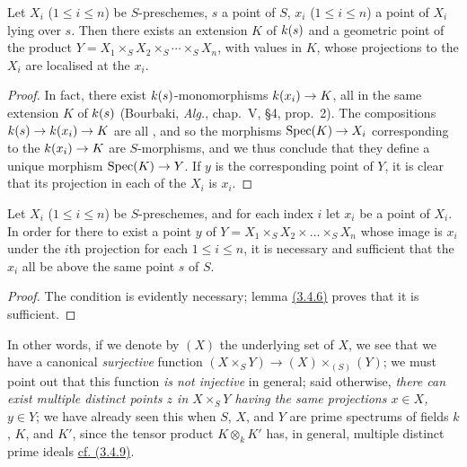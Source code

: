 \begin{lem}[3.4.6]
\label{lem-1.3.4.6}
Let $X_i$ ($1\leqslant i\leqslant n$) be $S$-preschemes, $s$ a point of $S$, $x_i$
($1\leqslant i\leqslant n$) a point of $X_i$ lying over $s$. Then there exists an extension
$K$ of $k(s)$ and a geometric point of the product
$Y=X_1\times_S X_2\times_S\cdots\times_S X_n$, with values in $K$, whose projections to
the $X_i$ are localised at the $x_i$.
\end{lem}

\begin{proof}
\label{proof-lem-1.3.4.6}
In fact, there exist $k(s)$-monomorphisms $k(x_i)\to K$, all in the same extension $K$ of $k(s)$ (Bourbaki, \emph{Alg.}, chap.~V, §4, prop.~2).
The compositions $k(s)\to k(x_i)\to K$ are all , and so the morphisms ${\mathop{\mathrm{Spec}}\nolimits}(K)\to X_i$ corresponding to the $k(x_i)\to K$ are $S$-morphisms, and we thus conclude that they define a unique morphism ${\mathop{\mathrm{Spec}}\nolimits}(K)\to Y$.
If $y$ is the corresponding point of $Y$, it is clear that its projection in each of the $X_i$ is $x_i$.
\end{proof}

\begin{prop}[3.4.7]
\label{prop-1.3.4.7}
Let $X_i$ ($1\leqslant i\leqslant n$) be $S$-preschemes, and for each index $i$ let $x_i$ be a point of $X_i$.
In order for there to exist a point $y$ of $Y=X_1\times_S X_2\times\ldots\times_S X_n$ whose image is $x_i$ under the $i$th projection for each $1\leqslant i\leqslant n$, it is necessary and sufficient that the $x_i$ all be above the same point $s$ of $S$.
\end{prop}

\begin{proof}
\label{proof-prop-1.3.4.7}
The condition is evidently necessary; lemma \hyperref[lem-1.3.4.6]{(3.4.6)} proves that it is sufficient.
\end{proof}

In other words, if we denote by $(X)$ the underlying set of $X$, we see that we have a canonical \emph{surjective} function $(X\times_S Y)\to(X)\times_{(S)}(Y)$; we must point out that this function \emph{is not injective} in general; said otherwise, \emph{there can exist multiple distinct points $z$ in $X\times_S Y$ having the same projections $x\in X$, $y\in Y$}; we have already seen this when $S$, $X$, and $Y$ are prime spectrums of fields $k$, $K$, and $K'$, since the tensor product $K\otimes_k K'$ has, in general, multiple distinct prime ideals \hyperref[prop-1.3.4.9]{cf. (3.4.9)}.

